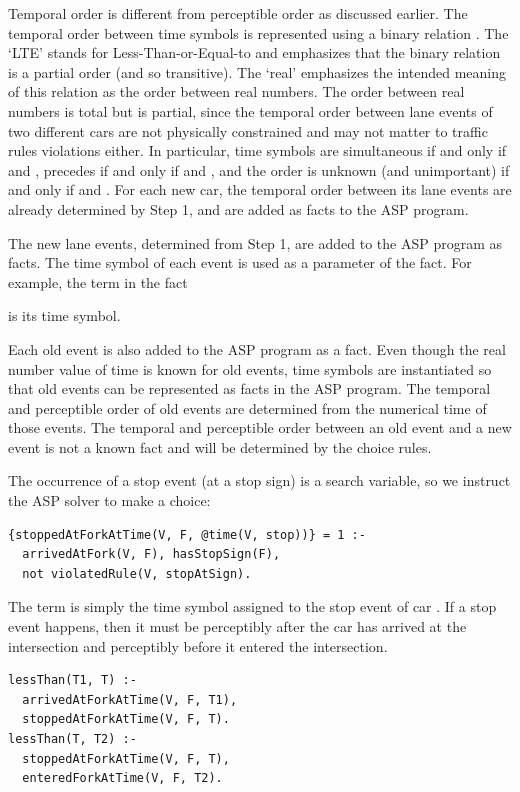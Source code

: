 Temporal order is different from perceptible order as discussed earlier.
%
The temporal order between time symbols is represented using a binary relation .
%
The `LTE' stands for Less-Than-or-Equal-to and emphasizes that the binary relation is a partial order (and so transitive).
%
The `real' emphasizes the intended meaning of this relation as the order between real numbers.
%
The order between real numbers is total but   is partial, since the temporal order between lane events of two different cars are not physically constrained and may not matter to traffic rules violations either.
%
In particular, time symbols  are simultaneous if and only if
 and ,  precedes  if and only if 
 and , and the order is unknown (and unimportant) if and only if  and .
%
For each new car, the temporal order between its lane events are already determined by Step 1, and are added as facts to the ASP program.

The new lane events, determined from Step 1, are added to the ASP program as facts.
%
The time symbol of each event is used as a parameter of the fact.
%
For example, the term  in the fact
\begin{center}
\end{center}
is its time symbol.


Each old event is also added to the ASP program as a fact.
%
Even though the real number value of time is known for old events, time symbols are instantiated so that old events can be represented as facts in the ASP program.
%
The temporal and perceptible order of old events are determined from the numerical time of those events.
%
The temporal and perceptible order between an old event and a new event is not a known fact and will be determined by the choice rules.


The occurrence of a stop event (at a stop sign) is a search variable, so we instruct the ASP solver to make a choice:
\begin{verbatim}
{stoppedAtForkAtTime(V, F, @time(V, stop))} = 1 :-
  arrivedAtFork(V, F), hasStopSign(F),
  not violatedRule(V, stopAtSign).
\end{verbatim}
%
The term  is simply the time symbol assigned to the stop event of car .
%
If a stop event happens, then it must be perceptibly after the car has arrived at the intersection and perceptibly before it entered the intersection.
\begin{verbatim}
lessThan(T1, T) :-  
  arrivedAtForkAtTime(V, F, T1),
  stoppedAtForkAtTime(V, F, T).
lessThan(T, T2) :-
  stoppedAtForkAtTime(V, F, T),  
  enteredForkAtTime(V, F, T2).
\end{verbatim}



